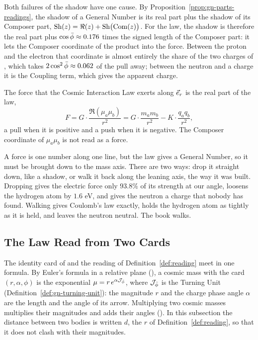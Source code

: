 Both failures of the shadow have one cause. By Proposition~\ref{prop:gn-parts-readings}, the shadow of a General Number is its real part plus the shadow of its Composer part, $\operatorname{Sh}(z) = \Re(z) + \operatorname{Sh}\bigl(\operatorname{Com}(z)\bigr)$. For the law, the shadow is therefore the real part plus $\cos\bar{\phi} \approx 0.176$ times the signed length of the Composer part: it lets the Composer coordinate of the product into the force. Between the proton and the electron that coordinate is almost entirely the share of the two charges of , which takes $2\cos^2\bar{\phi} \approx 0.062$ of the pull away; between the neutron and a charge it is the Coupling term, which gives the apparent charge.

\begin{definition}\label{def:reading}
The force that the Cosmic Interaction Law exerts along $\vec{e}_r$ is the real part of the law,
\[
F = G \cdot \frac{\Re(\mu_a \mu_b)}{r^2} = G \cdot \frac{m_a m_b}{r^2} - K \cdot \frac{q_a q_b}{r^2} ,
\]
a pull when it is positive and a push when it is negative. The Composer coordinate of $\mu_a \mu_b$ is not read as a force.
\end{definition}

\begin{plainwords}
A force is one number along one line, but the law gives a General Number, so it must be brought down to the mass axis. There are two ways: drop it straight down, like a shadow, or walk it back along the leaning axis, the way it was built. Dropping gives the electric force only $93.8\%$ of its strength at our angle, loosens the hydrogen atom by $1.6$ eV, and gives the neutron a charge that nobody has found. Walking gives Coulomb's law exactly, holds the hydrogen atom as tightly as it is held, and leaves the neutron neutral. The book walks.
\end{plainwords}

\subsection{The Law Read from Two Cards}\label{subsec:law-cards}

The identity card of  and the reading of Definition~\ref{def:reading} meet in one formula. By Euler's formula in a relative plane (), a cosmic mass with the card $(r, \alpha, \phi)$ is the exponential $\mu = r\,e^{\alpha\mathcal{J}_{\bar{\phi}}}$, where $\mathcal{J}_{\bar{\phi}}$ is the Turning Unit (Definition~\ref{def:gn-turning-unit}): the magnitude $r$ and the charge phase angle $\alpha$ are the length and the angle of its arrow. Multiplying two cosmic masses multiplies their magnitudes and adds their angles (). In this subsection the distance between two bodies is written $d$, the $r$ of Definition~\ref{def:reading}, so that it does not clash with their magnitudes.

